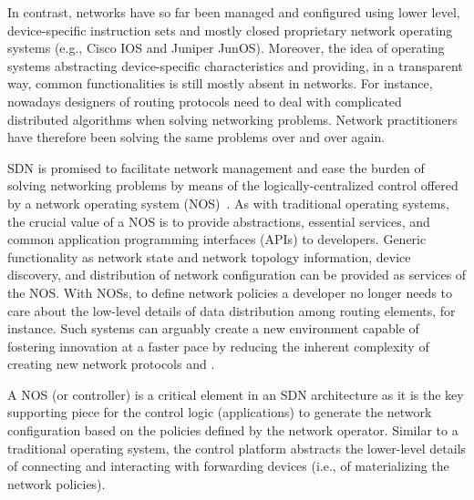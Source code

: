 In contrast, networks have so far been managed and configured using lower level, device-specific instruction 
sets and mostly closed proprietary network operating systems (e.g., Cisco IOS and Juniper JunOS). 
Moreover, the idea of operating systems abstracting device-specific characteristics 
and providing, in a transparent way, common functionalities is still mostly absent in networks.
For instance, nowadays designers of routing protocols need to deal with complicated distributed algorithms when solving networking problems.
Network practitioners have therefore been solving the same problems over and over again.

SDN is promised to facilitate network management and ease the burden of solving networking problems by means of the logically-centralized control offered by a network operating system (NOS)~\cite{gude2008}.
As with traditional operating systems, the crucial value of a NOS is to provide abstractions, essential services, 
and common application programming interfaces (APIs) to developers. 
Generic functionality as network state and network topology information, device discovery, and distribution of network configuration can be provided as services of the NOS.
With NOSs, to define network policies a developer no longer needs to care about the low-level details of data distribution among routing elements, for instance.
Such systems can arguably create a new environment capable of fostering innovation at a faster pace by reducing the inherent complexity of creating new network protocols and \manapps.

A NOS (or controller) is a critical element in an SDN architecture as it is the key supporting piece 
for the control logic (applications) to generate the network configuration based on the policies defined by the network operator. 
Similar to a traditional operating system, the control platform abstracts the lower-level details of connecting and interacting with forwarding devices (i.e., of materializing the network policies).

